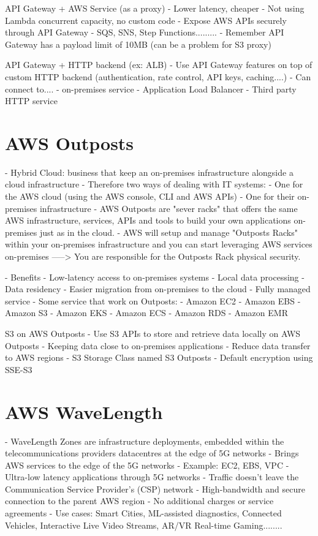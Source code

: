 API Gateway + AWS Service (as a proxy)
- Lower latency, cheaper
- Not using Lambda concurrent capacity, no custom code
- Expose AWS APIs securely through API Gateway
- SQS, SNS, Step Functions.........
- Remember API Gateway has a payload limit of 10MB (can be a problem for S3 proxy)

API Gateway + HTTP backend (ex: ALB)
- Use API Gateway features on top of custom HTTP backend (authentication, rate control, API keys, caching....)
- Can connect to....
- on-premises service
- Application Load Balancer
- Third party HTTP service


\section{AWS Outposts}
- Hybrid Cloud: business that keep an on-premises infrastructure alongside a cloud infrastructure
- Therefore two ways of dealing with IT systems:
- One for the AWS cloud (using the AWS console, CLI and AWS APIs)
- One for their on-premises infrastructure
- AWS Outposts are "sever racks" that offers the same AWS infrastructure, services, APIs and tools to build your own applications on-premises just as in the cloud.
- AWS will setup and manage "Outposts Racks" within your on-premises infrastructure and you can start leveraging AWS services on-premises
-----> You are responsible for the Outposts Rack physical security.

- Benefits
- Low-latency access to on-premises systems
- Local data processing
- Data residency
- Easier migration from on-premises to the cloud
- Fully managed service
- Some service that work on Outposts:
- Amazon EC2
- Amazon EBS
- Amazon S3
- Amazon EKS
- Amazon ECS
- Amazon RDS
- Amazon EMR

S3 on AWS Outposts
- Use S3 APIs to store and retrieve data locally on AWS Outposts
- Keeping data close to on-premises applications
- Reduce data transfer to AWS regions
- S3 Storage Class named S3 Outposts
- Default encryption using SSE-S3


\section{AWS WaveLength}
- WaveLength Zones are infrastructure deployments, embedded within the telecommunications providers datacentres at the edge of 5G networks
- Brings AWS services to the edge of the 5G networks
- Example: EC2, EBS, VPC
- Ultra-low latency applications through 5G networks
- Traffic doesn't leave the Communication Service Provider's (CSP) network
- High-bandwidth and secure connection to the parent AWS region
- No additional charges or service agreements
- Use cases: Smart Cities, ML-assisted diagnostics, Connected Vehicles, Interactive Live Video Streams, AR/VR Real-time Gaming........ %


